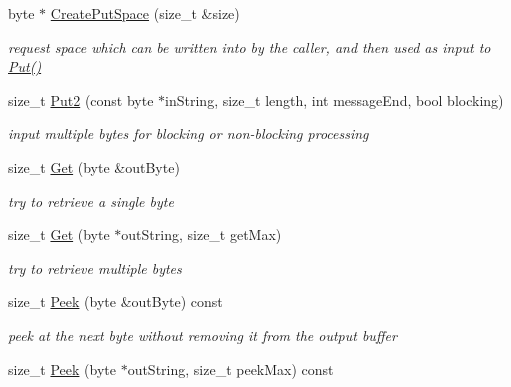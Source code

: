 \begin{DoxyCompactItemize}
\item 
byte $\ast$ \hyperlink{class_byte_queue_a144c8bb417fc6c9631ae979ce7b7d52a}{CreatePutSpace} (size\_\-t \&size)
\begin{DoxyCompactList}\small\item\em request space which can be written into by the caller, and then used as input to \hyperlink{class_buffered_transformation_ae70658b0d271f8e114ac6c3cc9774ede}{Put()} \item\end{DoxyCompactList}\item 
size\_\-t \hyperlink{class_byte_queue_a684942d5641278a78e7c237a5bd4c69d}{Put2} (const byte $\ast$inString, size\_\-t length, int messageEnd, bool blocking)
\begin{DoxyCompactList}\small\item\em input multiple bytes for blocking or non-\/blocking processing \item\end{DoxyCompactList}\item 
\hypertarget{class_byte_queue_a19413e3aa72b749e3771d617e8eca632}{
size\_\-t \hyperlink{class_byte_queue_a19413e3aa72b749e3771d617e8eca632}{Get} (byte \&outByte)}
\label{class_byte_queue_a19413e3aa72b749e3771d617e8eca632}

\begin{DoxyCompactList}\small\item\em try to retrieve a single byte \item\end{DoxyCompactList}\item 
\hypertarget{class_byte_queue_a933457ad0a5a34fb5e7dc71b2a92c3a7}{
size\_\-t \hyperlink{class_byte_queue_a933457ad0a5a34fb5e7dc71b2a92c3a7}{Get} (byte $\ast$outString, size\_\-t getMax)}
\label{class_byte_queue_a933457ad0a5a34fb5e7dc71b2a92c3a7}

\begin{DoxyCompactList}\small\item\em try to retrieve multiple bytes \item\end{DoxyCompactList}\item 
\hypertarget{class_byte_queue_a67e9cc7f56a2be014ee4c9f033bb2ada}{
size\_\-t \hyperlink{class_byte_queue_a67e9cc7f56a2be014ee4c9f033bb2ada}{Peek} (byte \&outByte) const }
\label{class_byte_queue_a67e9cc7f56a2be014ee4c9f033bb2ada}

\begin{DoxyCompactList}\small\item\em peek at the next byte without removing it from the output buffer \item\end{DoxyCompactList}\item 
\hypertarget{class_byte_queue_ab18a5abc1d881c014705a7ea0c467d81}{
size\_\-t \hyperlink{class_byte_queue_ab18a5abc1d881c014705a7ea0c467d81}{Peek} (byte $\ast$outString, size\_\-t peekMax) const }
\label{class_byte_queue_ab18a5abc1d881c014705a7ea0c467d81}


\end{DoxyCompactItemize}
